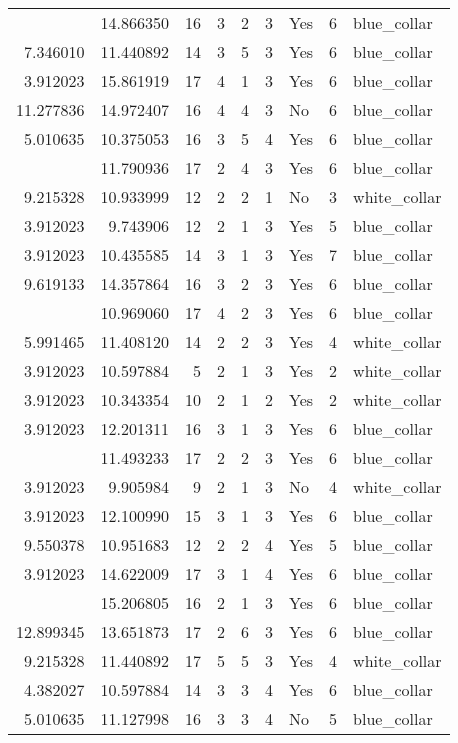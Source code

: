 \documentclass[
]{article}
\begin{document}
\begin{longtable}[t]{rrrrrllrl}
\addlinespace
10.310618 & 14.866350 & 16 & 3 & 2 & 3 & Yes & 6 & blue\_collar\\
7.346010 & 11.440892 & 14 & 3 & 5 & 3 & Yes & 6 & blue\_collar\\
3.912023 & 15.861919 & 17 & 4 & 1 & 3 & Yes & 6 & blue\_collar\\
11.277836 & 14.972407 & 16 & 4 & 4 & 3 & No & 6 & blue\_collar\\
5.010635 & 10.375053 & 16 & 3 & 5 & 4 & Yes & 6 & blue\_collar\\
\addlinespace
7.467371 & 11.790936 & 17 & 2 & 4 & 3 & Yes & 6 & blue\_collar\\
9.215328 & 10.933999 & 12 & 2 & 2 & 1 & No & 3 & white\_collar\\
3.912023 & 9.743906 & 12 & 2 & 1 & 3 & Yes & 5 & blue\_collar\\
3.912023 & 10.435585 & 14 & 3 & 1 & 3 & Yes & 7 & blue\_collar\\
9.619133 & 14.357864 & 16 & 3 & 2 & 3 & Yes & 6 & blue\_collar\\
\addlinespace
7.803843 & 10.969060 & 17 & 4 & 2 & 3 & Yes & 6 & blue\_collar\\
5.991465 & 11.408120 & 14 & 2 & 2 & 3 & Yes & 4 & white\_collar\\
3.912023 & 10.597884 & 5 & 2 & 1 & 3 & Yes & 2 & white\_collar\\
3.912023 & 10.343354 & 10 & 2 & 1 & 2 & Yes & 2 & white\_collar\\
3.912023 & 12.201311 & 16 & 3 & 1 & 3 & Yes & 6 & blue\_collar\\
\addlinespace
7.625595 & 11.493233 & 17 & 2 & 2 & 3 & Yes & 6 & blue\_collar\\
3.912023 & 9.905984 & 9 & 2 & 1 & 3 & No & 4 & white\_collar\\
3.912023 & 12.100990 & 15 & 3 & 1 & 3 & Yes & 6 & blue\_collar\\
9.550378 & 10.951683 & 12 & 2 & 2 & 4 & Yes & 5 & blue\_collar\\
3.912023 & 14.622009 & 17 & 3 & 1 & 4 & Yes & 6 & blue\_collar\\
\addlinespace
3.912023 & 15.206805 & 16 & 2 & 1 & 3 & Yes & 6 & blue\_collar\\
12.899345 & 13.651873 & 17 & 2 & 6 & 3 & Yes & 6 & blue\_collar\\
9.215328 & 11.440892 & 17 & 5 & 5 & 3 & Yes & 4 & white\_collar\\
4.382027 & 10.597884 & 14 & 3 & 3 & 4 & Yes & 6 & blue\_collar\\
5.010635 & 11.127998 & 16 & 3 & 3 & 4 & No & 5 & blue\_collar\\

\end{longtable}
\end{document}
